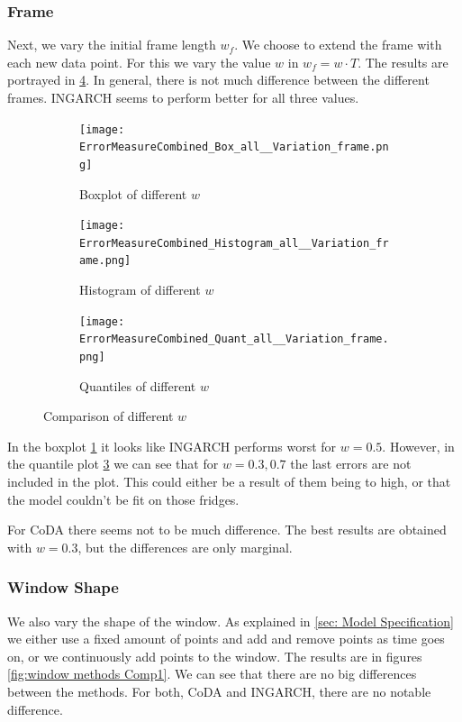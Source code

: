 \subsubsection{Frame}
\label{sec:Frame}

Next, we vary the initial frame length $w_f$. We choose to extend the frame with each new data point. For this we vary the value $w$ in $w_f=w\cdot T$. The results are portrayed in \ref{fig:Frame Comp1}. In general, there is not much difference between the different frames. INGARCH seems to perform better for all three values.
\begin{figure}[htb!]
\centering
\begin{subfigure}[b]{0.45\textwidth}
\texttt{[image: ErrorMeasureCombined\_Box\_all\_\_Variation\_frame.png]}
\caption{Boxplot of different $w$}
\label{fig:Frame Box}
\end{subfigure}
\hfill
\begin{subfigure}[b]{0.45\textwidth}
\texttt{[image: ErrorMeasureCombined\_Histogram\_all\_\_Variation\_frame.png]}
\caption{Histogram of different $w$}
\label{fig:Frame Hist}
\end{subfigure}
\hfill
\begin{subfigure}[b]{0.8\textwidth}
\texttt{[image: ErrorMeasureCombined\_Quant\_all\_\_Variation\_frame.png]}
\caption{Quantiles of different $w$}
\label{fig:Frame Quant}
\end{subfigure}
\caption{Comparison of different $w$}
\label{fig:Frame Comp1}
\end{figure}


In the boxplot \ref{fig:Frame Box} it looks like INGARCH performs worst for $w=0.5$. However, in the quantile plot \ref{fig:Frame Quant} we can see that for $w=0.3,0.7$ the last errors are not included  in the plot. This could either be a result of them being to high, or that the model couldn't be fit on those fridges. 

For CoDA there seems not to be much difference. The best results are obtained with $w=0.3$, but the differences are only marginal. 


\subsubsection{Window Shape}
\label{sec:Window Shape}

We also vary the shape of the window. As explained in \ref{sec: Model Specification} we either use a fixed amount of points and add and remove points as time goes on, or we continuously add points to the window. The results are in figures \ref{fig:window methods Comp1}. We can see that there are no big differences between the methods. For both, CoDA and INGARCH, there are no notable difference. 

